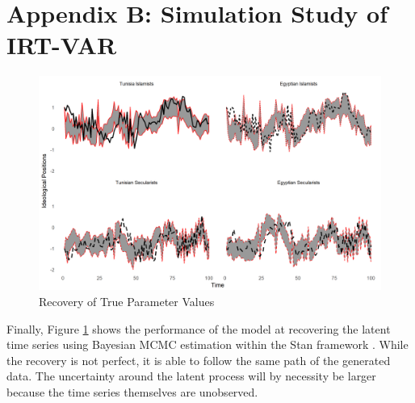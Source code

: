 \documentclass[12pt]{article}
\begin{document}
\section*{Appendix B: Simulation Study of IRT-VAR}

\begin{figure}[!h]
	\caption{Recovery of True Parameter Values}\label{true_pars}
	\centering
	\includegraphics[width=.9\linewidth]{true_estimated.png}
\end{figure}

Finally, Figure \ref{true_pars} shows the performance of the model at recovering the latent time series using Bayesian MCMC estimation within the Stan framework \parencite{carpenter2017}. While the recovery is not perfect, it is able to follow the same path of the generated data. The uncertainty around the latent process will by necessity be larger because the time series themselves are unobserved.

\printbibliography
\end{document}
